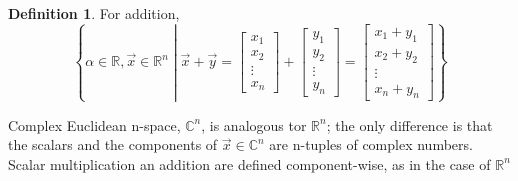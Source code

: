 \documentclass{book}
\theoremstyle{definition}
\newtheorem{definition}{Definition}[section]
\theoremstyle{remark}
\newcommand{\bb}[1]{\mathbb{#1}}
\begin{document}
\begin{definition}
    For addition, 
        \begin{equation*}
            \left \{ \alpha \in \bb{R}, \vec{x} \in \bb{R}^n \middle | \vec{x} + \vec{y} = \begin{bmatrix} x_1 \\ x_2 \\ \vdots \\ x_n \end{bmatrix} + \begin{bmatrix} y_1 \\ y_2 \\ \vdots \\ y_n \end{bmatrix} = \begin{bmatrix} x_1 + y_1 \\ x_2 + y_2 \\ \vdots \\ x_n + y_n \end{bmatrix} \right \}
        \end{equation*}
    
    Complex Euclidean n-space, $\bb{C}^n$, is analogous tor $\bb{R}^n$; the only difference is that the scalars and the components of $\vec{x} \in \bb{C}^n$ are n-tuples of complex numbers. Scalar multiplication an addition are defined component-wise, as in the case of $\bb{R}^n$
    \end{definition}
\end{document}
